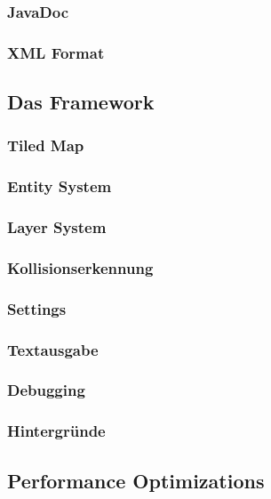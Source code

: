 		\subsubsection{JavaDoc}						
		\subsubsection{XML Format}					
	\subsection{Das Framework}
		\subsubsection{Tiled Map}					
		\subsubsection{Entity System}				
		\subsubsection{Layer System}				
		\subsubsection{Kollisionserkennung}			
		\subsubsection{Settings}					
		\subsubsection{Textausgabe}					
		\subsubsection{Debugging}					
		\subsubsection{Hintergründe}				
	\subsection{Performance Optimizations}			
